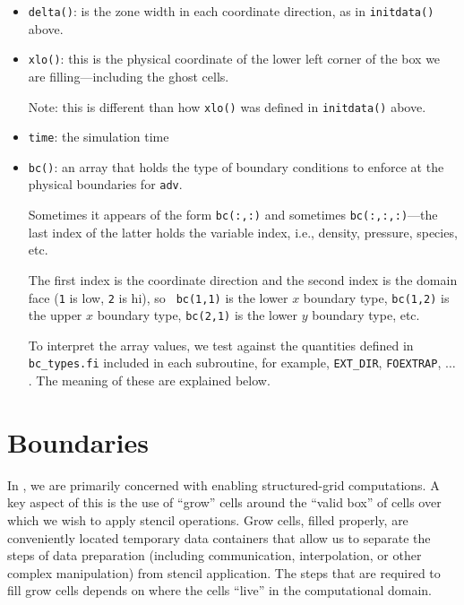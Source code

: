\begin{itemize}
\begin{itemize}
  \item {\tt delta()}: is the zone width in each coordinate direction,
    as in {\tt initdata()} above.

  \item {\tt xlo()}: this is the physical coordinate of the lower
    left corner of the box we are filling---including the ghost cells.

    Note: this is different than how {\tt xlo()} was defined in
    {\tt initdata()} above.

  \item {\tt time}: the simulation time

  \item {\tt bc()}: an array that holds the type of boundary conditions
    to enforce at the physical boundaries for {\tt adv}.

    Sometimes it appears of the form {\tt bc(:,:)} and sometimes
    {\tt bc(:,:,:)}---the last index of the latter holds the variable
    index, i.e., density, pressure, species, etc.

    The first index is the coordinate direction and the second index
    is the domain face ({\tt 1} is low, {\tt 2} is hi), so {\tt
    bc(1,1)} is the lower $x$ boundary type, {\tt bc(1,2)} is
    the upper $x$ boundary type, {\tt bc(2,1)} is the lower
    $y$ boundary type, etc.

    To interpret the array values, we test against the quantities
    defined in {\tt bc\_types.fi} included in each subroutine,
    for example, {\tt EXT\_DIR}, {\tt FOEXTRAP}, $\ldots$.  The
    meaning of these are explained below.
      
  \end{itemize}
    
\end{itemize}


\section{Boundaries}
In \boxlib, we are primarily concerned with enabling structured-grid
computations.  A key aspect of this is the use of ``grow'' cells
around the ``valid box'' of cells over which we wish to apply stencil operations.
Grow cells, filled properly, are conveniently located temporary 
data containers that allow us to separate the steps of data preparation
(including communication, interpolation, or other complex manipulation)
from stencil application.  The steps that are required to fill grow cells
depends on where the cells ``live'' in the computational domain.

